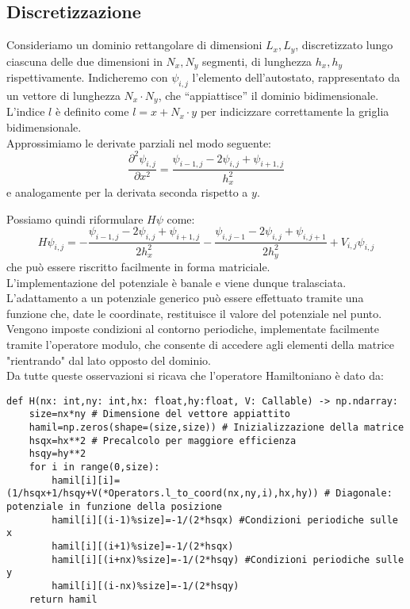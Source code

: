 \documentclass{article}
\begin{document}
\subsection{Discretizzazione}
Consideriamo un dominio rettangolare di dimensioni $L_x, L_y$, discretizzato lungo ciascuna delle due dimensioni in $N_x, N_y$ segmenti, di lunghezza $h_x, h_y$ rispettivamente. Indicheremo con $\psi_{i,j}$ l’elemento dell’autostato, rappresentato da un vettore di lunghezza $N_x \cdot N_y$, che “appiattisce” il dominio bidimensionale. L’indice $l$ è definito come $l = x + N_x \cdot y$ per indicizzare correttamente la griglia bidimensionale. \\

Approssimiamo le derivate parziali nel modo seguente:
\begin{equation}
\frac{\partial^2 \psi_{i,j}}{\partial x^2}=\frac{\psi_{i-1,j}-2\psi_{i,j}+\psi_{i+1,j}}{h_x^2}
\end{equation}
e analogamente per la derivata seconda rispetto a $y$.

Possiamo quindi riformulare $H\psi$ come:
\begin{equation}
    H\psi_{i,j} = -\frac{\psi_{i-1,j} - 2\psi_{i,j} + \psi_{i+1,j}}{2h_x^2}
                 - \frac{\psi_{i,j-1} - 2\psi_{i,j} + \psi_{i,j+1}}{2h_y^2}
                 + V_{i,j} \psi_{i,j}
\end{equation}
che può essere riscritto facilmente in forma matriciale. \\

L’implementazione del potenziale è banale e viene dunque tralasciata. L’adattamento a un potenziale generico può essere effettuato tramite una funzione che, date le coordinate, restituisce il valore del potenziale nel punto. \\

Vengono imposte condizioni al contorno periodiche, implementate facilmente tramite l’operatore modulo, che consente di accedere agli elementi della matrice "rientrando" dal lato opposto del dominio. \\

Da tutte queste osservazioni si ricava che l’operatore Hamiltoniano è dato da:

\begin{lstlisting}
def H(nx: int,ny: int,hx: float,hy:float, V: Callable) -> np.ndarray:
    size=nx*ny # Dimensione del vettore appiattito
    hamil=np.zeros(shape=(size,size)) # Inizializzazione della matrice
    hsqx=hx**2 # Precalcolo per maggiore efficienza
    hsqy=hy**2
    for i in range(0,size):
        hamil[i][i]=(1/hsqx+1/hsqy+V(*Operators.l_to_coord(nx,ny,i),hx,hy)) # Diagonale: potenziale in funzione della posizione
        hamil[i][(i-1)%size]=-1/(2*hsqx) #Condizioni periodiche sulle x
        hamil[i][(i+1)%size]=-1/(2*hsqx)
        hamil[i][(i+nx)%size]=-1/(2*hsqy) #Condizioni periodiche sulle y
        hamil[i][(i-nx)%size]=-1/(2*hsqy)
    return hamil
\end{lstlisting}
\end{document}
